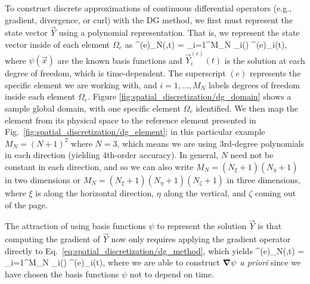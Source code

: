 \documentclass{article}
\begin{document}
To construct discrete approximations of continuous differential operators (e.g., gradient, divergence, or curl) with the DG method, we first must represent the state vector $\vec{Y}$ using a polynomial representation.  That is, we represent the state vector inside of each element $\Omega_e$ as
\be
{}^{(e)}_N(,t) = \sum_{i=1}^{M_N} \psi_i() ^{(e)}_i(t),
\label{eq:spatial_discretization/dg_method}
\ee
where $\psi(\vec{x})$ are the known basis functions and $\vec{Y}^{(e)}_i(t)$ is the solution at each degree of freedom, which is time-dependent. The superscript $(e)$ represents the specific element we are working with, and $i=1,\ldots,M_N$ labels degrees of freedom inside each element $\Omega_e$.  Figure \ref{fig:spatial_discretization/dg_domain} shows a sample global domain, with one specific element $\Omega_e$ identified.  We then map the element from its physical space to the reference element presented in Fig.\ \ref{fig:spatial_discretization/dg_element}; in this particular example $M_N=(N+1)^2$ where $N=3$, which means we are using 3rd-degree polynomials in each direction (yielding 4th-order accuracy).  In general, $N$ need not be constant in each direction, and so we can also write $M_N=(N_{\xi}+1)(N_{\eta}+1)$ in two dimensions or $M_N=(N_{\xi}+1)(N_{\eta}+1)(N_{\zeta}+1)$ in three dimensions, where $\xi$ is along the horizontal direction, $\eta$ along the vertical, and $\zeta$ coming out of the page. 

The attraction of using basis functions $\psi$ to represent the solution $\vec{Y}$ is that computing the gradient of $\vec{Y}$ now only requires applying the gradient operator directly to Eq.~\eqref{eq:spatial_discretization/dg_method}, which yields
\be
\nabla {}^{(e)}_N(,t) = \sum_{i=1}^{M_N} \nabla \psi_i() ^{(e)}_i(t),
\label{eq:spatial_discretization/dg_method/gradient}
\ee
where we are able to construct $\boldsymbol{{\nabla}} \psi$ \emph{a priori} since we have chosen the basis functions $\psi$ not to depend on time.
\end{document}
